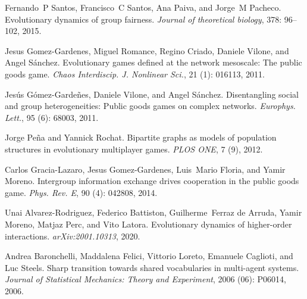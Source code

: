 Fernando~P Santos, Francisco~C Santos, Ana Paiva, and Jorge~M Pacheco.
\newblock Evolutionary dynamics of group fairness.
\newblock \emph{Journal of theoretical biology}, 378: 96--102, 2015.

Jesus {Gomez-Gardenes}, Miguel Romance, Regino Criado, Daniele Vilone, and
Angel S{\'a}nchez.
\newblock Evolutionary games defined at the network mesoscale: {{The}} public
goods game.
\newblock \emph{Chaos Interdiscip. J. Nonlinear Sci.}, 21
(1): 016113, 2011.

Jes{\'u}s {G{\'o}mez-Garde{\~n}es}, Daniele Vilone, and Angel S{\'a}nchez.
\newblock Disentangling social and group heterogeneities: {{Public}} goods
games on complex networks.
\newblock \emph{Europhys. Lett.}, 95 (6): 68003, 2011.

Jorge Pe{\~n}a and Yannick Rochat.
\newblock Bipartite graphs as models of population structures in evolutionary
multiplayer games.
\newblock \emph{PLOS ONE}, 7 (9), 2012.

Carlos {Gracia-Lazaro}, Jesus {Gomez-Gardenes}, Luis~Mario Floria, and Yamir
Moreno.
\newblock Intergroup information exchange drives cooperation in the public
goods game.
\newblock \emph{Phys. Rev. E}, 90 (4): 042808, 2014.

Unai {Alvarez-Rodriguez}, Federico Battiston, Guilherme~Ferraz {de Arruda},
Yamir Moreno, Matjaz Perc, and Vito Latora.
\newblock Evolutionary dynamics of higher-order interactions.
\newblock \emph{arXiv:2001.10313}, 2020.

Andrea Baronchelli, Maddalena Felici, Vittorio Loreto, Emanuele Caglioti, and
Luc Steels.
\newblock Sharp transition towards shared vocabularies in multi-agent systems.
\newblock \emph{Journal of Statistical Mechanics: Theory and Experiment},
2006 (06): P06014, 2006{}.

